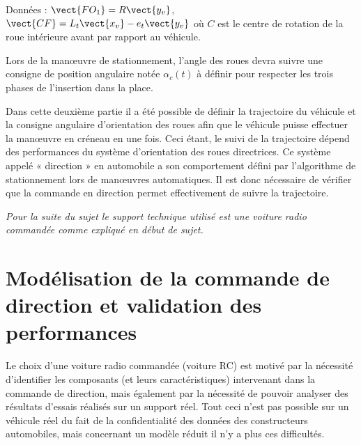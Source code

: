 Données : $\vect{FO_1}=R\vect{y_v}$, $\vect{CF}=L_t\vect{x_v}-e_t\vect{y_v}$ où $C$ est le centre de rotation de la roue intérieure avant par rapport au véhicule.



Lors de la manœuvre de stationnement, l’angle des roues devra suivre une consigne de position angulaire notée $\alpha_c(t)$ à définir pour respecter les trois phases de l’insertion dans la place.


Dans cette deuxième partie il a été possible de définir la trajectoire du véhicule et la consigne angulaire d’orientation des roues afin que le véhicule puisse effectuer la manœuvre en créneau en une fois. Ceci étant, le suivi de la trajectoire dépend des performances du système d’orientation des roues directrices. Ce système appelé
« direction » en automobile a son comportement défini par l’algorithme de stationnement lors de manœuvres
automatiques. Il est donc nécessaire de vérifier que la commande en direction permet effectivement de suivre la
trajectoire.

\textit{Pour la suite du sujet le support technique utilisé est une voiture radio commandée comme expliqué en début de sujet.}

\section{Modélisation de la commande de direction et validation des performances}
Le choix d’une voiture radio commandée (voiture RC) est motivé par la nécessité d’identifier les composants (et
leurs caractéristiques) intervenant dans la commande de direction, mais également par la nécessité de pouvoir
analyser des résultats d’essais réalisés sur un support réel. Tout ceci n’est pas possible sur un véhicule réel du
fait de la confidentialité des données des constructeurs automobiles, mais concernant un modèle réduit il n’y a
plus ces difficultés.

